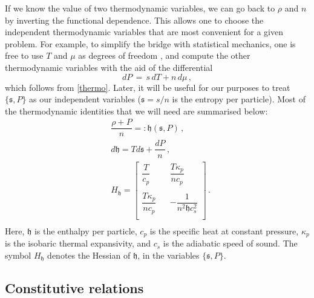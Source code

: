 \documentclass[a4paper, amsfonts, amssymb, amsmath, reprint, showkeys, nofootinbib, twoside, onecolumn, notitlepage]{revtex4-1}
\theoremstyle{definition}
\theoremstyle{theorem}
\begin{document}
If we know the value of two thermodynamic variables, we can go back to $\rho$ and $n$ by inverting the functional dependence. This allows one to choose the independent thermodynamic variables that are most convenient for a given problem. For example, to simplify the bridge with statistical mechanics, one is free to use $T$ and $\mu$ as degrees of freedom \cite{KovtunLecture2012,BecattiniLecture2019}, and compute the other thermodynamic variables with the aid of the differential
\begin{equation}\label{dPippuz}
dP \, = \, s \, dT+n \, d\mu \, ,
\end{equation}
which follows from \eqref{thermo}. Later, it will be useful for our purposes to treat  $\{ \mathfrak{s} ,P\}$ as our independent variables ($\mathfrak{s}=s/n$ is the entropy per particle). Most of the thermodynamic identities that we will need are summarised below:
\begin{equation}\label{dhuzz}
\begin{split}
& \dfrac{\rho +P}{n}  =: \mathfrak{h}(\mathfrak{s},P) \, , \\ 
& d\mathfrak{h} = T d \mathfrak{s} + \dfrac{dP}{n} \, , \\
& H_{\mathfrak{h}} =
\begin{bmatrix}
   \dfrac{T}{c_p} & & \dfrac{T \kappa_p}{n c_p}  \\
   \\
   \dfrac{T \kappa_p}{n c_p} & & -\dfrac{1}{n^2 \mathfrak{h} c_s^2}  \\
\end{bmatrix} \, .
 \\
\end{split}
\end{equation}
Here, $\mathfrak{h}$ is the enthalpy per particle, $c_p$ is the specific heat at constant pressure, $ \kappa_p$ is the isobaric thermal expansivity, and $c_s$ is the adiabatic speed of sound. The symbol $H_{\mathfrak{h}}$ denotes the Hessian of $\mathfrak{h}$, in the variables $\{ \mathfrak{s},P \}$.  


\subsection{Constitutive relations}
\end{document}
